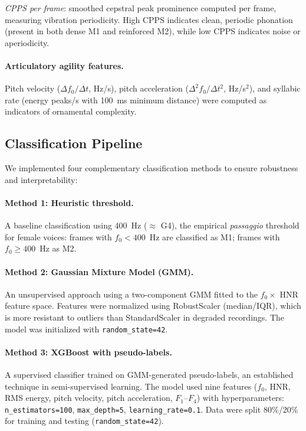 \documentclass[review,3p,number]{elsarticle}
\begin{document}
\emph{CPPS per frame}\cite{maryn2015}: smoothed cepstral peak prominence computed per
frame, measuring vibration periodicity. High CPPS indicates clean, periodic phonation
(present in both dense M1 and reinforced M2), while low CPPS indicates noise or
aperiodicity.

\paragraph{Articulatory agility features.}
Pitch velocity ($\Delta f_0/\Delta t$, Hz/s), pitch acceleration
($\Delta^2 f_0/\Delta t^2$, Hz/s$^2$), and syllabic rate (energy peaks/s with
100~ms minimum distance) were computed as indicators of ornamental complexity.

\subsection{Classification Pipeline}
\label{sec:classification}

We implemented four complementary classification methods to ensure robustness and
interpretability:

\paragraph{Method 1: Heuristic threshold.}
A baseline classification using 400~Hz ($\approx$ G4), the empirical
\emph{passaggio} threshold for female voices: frames with $f_0 < 400$~Hz are
classified as M1; frames with $f_0 \geq 400$~Hz as M2.

\paragraph{Method 2: Gaussian Mixture Model (GMM).}
An unsupervised approach using a two-component GMM fitted to the $f_0 \times$ HNR
feature space. Features were normalized using RobustScaler (median/IQR), which is
more resistant to outliers than StandardScaler in degraded recordings. The model was
initialized with \texttt{random\_state=42}.

\paragraph{Method 3: XGBoost with pseudo-labels.}
A supervised classifier\cite{chen2016} trained on GMM-generated pseudo-labels, an
established technique in semi-supervised learning.\cite{lee2013,nigam2000} The model
used nine features ($f_0$, HNR, RMS energy, pitch velocity, pitch acceleration, $F_1$--$F_4$)
with hyperparameters: \texttt{n\_estimators=100}, \texttt{max\_depth=5},
\texttt{learning\_rate=0.1}. Data were split 80\%/20\% for training and testing
(\texttt{random\_state=42}).
\end{document}
